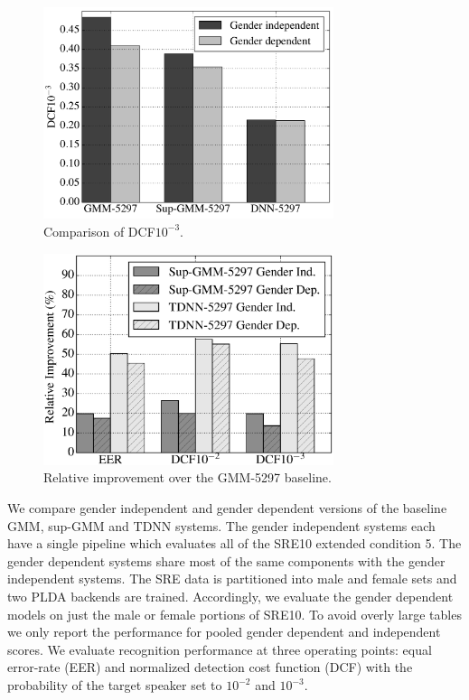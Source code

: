 \documentclass{article}
\begin{document}
\begin{figure}[t]
\centerline{\includegraphics[width=8.5cm]{fig/dcf-3}}
\caption{Comparison of DCF$10^{-3}$.}
\label{fig:dcf_3}
\end{figure}

\begin{figure}[th]
\centerline{\includegraphics[width=8.5cm]{fig/rel}}
\caption{Relative improvement over
              the GMM-5297 baseline.}
\label{fig:rel}
\end{figure}

We compare gender independent and gender dependent versions of the
baseline GMM, sup-GMM and TDNN systems. The gender independent
systems each have a single pipeline which evaluates all of the SRE10
extended condition 5. The gender dependent systems share most of the
same components with the gender independent systems. 
The SRE data is partitioned into male and female sets and two PLDA
backends are trained. Accordingly, we evaluate the gender
dependent models on just the male or female portions of SRE10. To avoid 
overly large
tables we only report the performance for pooled gender dependent
and independent scores.
We evaluate recognition performance at three operating points: 
equal error-rate (EER) and normalized detection cost function (DCF) \cite{sre10}
with the probability of the target speaker set to $10^{-2}$ and $10^{-3}$.
\end{document}
